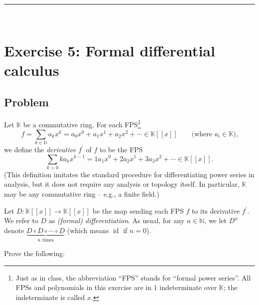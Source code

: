 \documentclass[paper=a4, fontsize=12pt]{scrartcl}%
\let\sumnonlimits\sum
\renewcommand{\sum}{\sumnonlimits\limits}
\theoremstyle{plainsl}
\theoremstyle{definition}
\theoremstyle{remark}
\begin{document}
\rule{\linewidth}{0.3pt} \\[0.4cm]

\section{Exercise 5: Formal differential calculus}

\subsection{Problem}

Let $\mathbb{K}$ be a commutative ring. For each FPS\footnote{Just as in
class, the abbreviation ``FPS'' stands for ``formal power series''. All FPSs
and polynomials in this exercise are in $1$ indeterminate over $\mathbb{K}$;
the indeterminate is called $x$.}
\[
f = \sum_{k \in\mathbb{N}} a_{k} x^{k} = a_{0} x^{0} + a_{1} x^{1} + a_{2}
x^{2} + \cdots\in\mathbb{K}\left[  \left[  x \right]  \right]  \qquad
\text{(where $a_{i} \in\mathbb{K}$),}%
\]
we define the \textit{derivative} $f^{\prime}$ of $f$ to be the FPS
\[
\sum_{k > 0} k a_{k} x^{k-1} = 1 a_{1} x^{0} + 2 a_{2} x^{1} + 3 a_{3} x^{2} +
\cdots\in\mathbb{K}\left[  \left[  x \right]  \right]  .
\]
(This definition imitates the standard procedure for differentiating power
series in analysis, but it does not require any analysis or topology itself.
In particular, $\mathbb{K}$ may be any commutative ring -- e.g., a finite field.)

Let $D : \mathbb{K}\left[  \left[  x \right]  \right]  \to\mathbb{K}\left[
\left[  x \right]  \right]  $ be the map sending each FPS $f$ to its
derivative $f^{\prime}$. We refer to $D$ as \textit{(formal) differentiation}.
As usual, for any $n \in\mathbb{N}$, we let $D^{n}$ denote $\underbrace{D
\circ D \circ\cdots\circ D}_{n \text{ times}}$ (which means $\operatorname{id}%
$ if $n = 0 $).

Prove the following:
\end{document}
